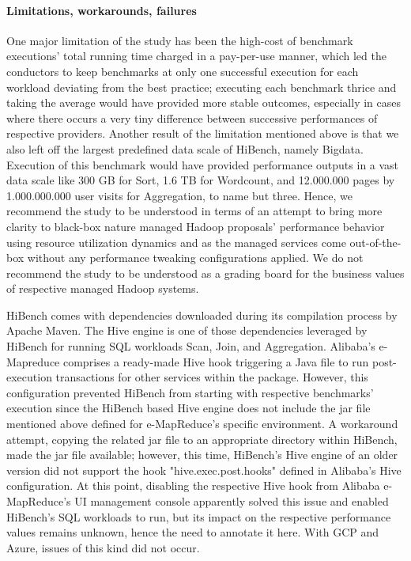 \documentclass[review]{elsarticle}
\begin{document}
\paragraph{Limitations, workarounds, failures}One major limitation of the study has been the high-cost of benchmark executions' total running time charged in a pay-per-use manner, which led the conductors to keep benchmarks at only one successful execution for each workload deviating from the best practice; executing each benchmark thrice and taking the average would have provided more stable outcomes, especially in cases where there occurs a very tiny difference between successive performances of respective providers. Another result of the  limitation mentioned above is that we also left off the largest predefined data scale of HiBench, namely Bigdata. Execution of this benchmark would have provided performance outputs in a vast data scale like 300 GB for Sort, 1.6 TB for Wordcount, and 12.000.000 pages by 1.000.000.000 user visits for Aggregation, to name but three. Hence, we recommend the study to be understood in terms of an attempt to bring more clarity to black-box nature managed Hadoop proposals' performance behavior using resource utilization dynamics and as the managed services come out-of-the-box without any performance tweaking configurations applied. We do not recommend the study to be understood as a grading board for the business values of respective managed Hadoop systems.

HiBench comes with dependencies downloaded during its compilation process by Apache Maven. The Hive engine is one of those dependencies leveraged by HiBench for running SQL workloads Scan, Join, and Aggregation. Alibaba's e-Mapreduce comprises a ready-made Hive hook triggering a Java file to run post-execution transactions for other services within the package. However, this configuration prevented HiBench from starting with respective benchmarks' execution since the HiBench based Hive engine does not include the jar file mentioned above defined for e-MapReduce's specific environment. A workaround attempt, copying the related jar file to an appropriate directory within HiBench, made the jar file available; however, this time, HiBench's Hive engine of an older version did not support the hook "hive.exec.post.hooks" defined in Alibaba's Hive configuration. At this point, disabling the respective Hive hook from Alibaba e-MapReduce's UI management console apparently solved this issue and enabled HiBench's SQL workloads to run, but its impact on the respective performance values remains unknown, hence the need to annotate it here. With GCP and Azure, issues of this kind did not occur.
\end{document}
